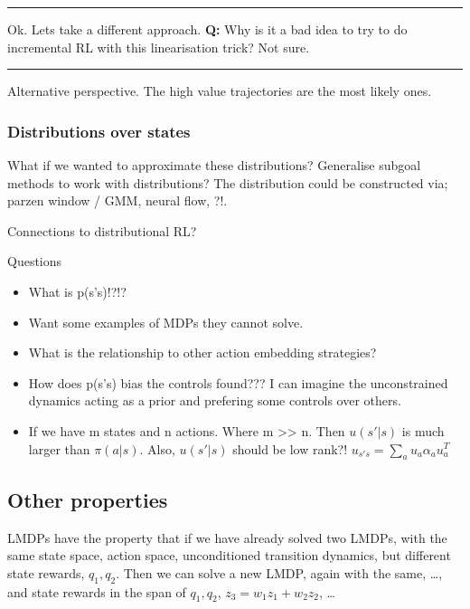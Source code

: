 \begin{center}\rule{0.5\linewidth}{\linethickness}\end{center}

Ok. Lets take a different approach. \textbf{Q:} Why is it a bad idea to
try to do incremental RL with this linearisation trick? Not sure.

\begin{center}\rule{0.5\linewidth}{\linethickness}\end{center}

Alternative perspective. The high value trajectories are the most likely
ones.

\hypertarget{distributions-over-states}{%
\subsubsection{Distributions over
states}\label{distributions-over-states}}

What if we wanted to approximate these distributions? Generalise subgoal
methods to work with distributions? The distribution could be
constructed via; parzen window / GMM, neural flow, ?!.

Connections to distributional RL?

Questions

\begin{itemize}
\tightlist
\item
  What is p(s'\textbar{}s)!?!?
\item
  Want some examples of MDPs they cannot solve.
\item
  What is the relationship to other action embedding strategies?
\item
  How does p(s'\textbar{}s) bias the controls found??? I can imagine the
  unconstrained dynamics acting as a prior and prefering some controls
  over others.
\item
  If we have m states and n actions. Where m
  \textgreater{}\textgreater{} n. Then \(u(s'|s)\) is much larger than
  \(\pi(a|s)\). Also, \(u(s'|s)\) should be low rank?!
  \(u_{s's} = \sum_a u_a \alpha_a u_a^T\)
\end{itemize}

\hypertarget{other-properties}{%
\subsection{Other properties}\label{other-properties}}

LMDPs have the property that if we have already solved two LMDPs, with
the same state space, action space, unconditioned transition dynamics,
but different state rewards, \(q_1, q_2\). Then we can solve a new LMDP,
again with the same, \ldots{}, and state rewards in the span of
\(q_1, q_2\), \(z_3 = w_1 z_1 + w_2 z_2\), \ldots{}

